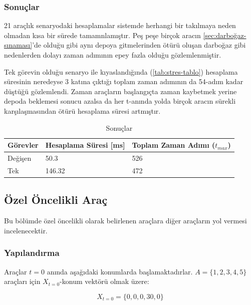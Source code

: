     \subsubsection{Sonuçlar}
    
    21 araçlık senaryodaki hesaplamalar sistemde herhangi bir takılmaya neden olmadan kısa bir sürede tamamnlamıştır. Peş peşe birçok aracın \autoref{sec:darboğaz-sınaması}'de olduğu gibi aynı depoya gitmelerinden ötürü oluşan darboğaz gibi nedenlerden dolayı zaman adımının epey fazla olduğu gözlemlenmiştir.
    
    Tek görevin olduğu senaryo ile kıyaslandığında (\autoref{tab:stres-tablo}) hesaplama süresinin neredeyse 3 katına çıktığı toplam zaman adımının da 54-adım kadar düştüğü gözlemlendi. Zaman araçların başlangıçta zaman kaybetmek yerine depoda beklemesi sonucu azalsa da her t-anında yolda birçok aracın sürekli karşılaşmasından ötürü hesaplama süresi artmıştır.
    
    
    \begin{table}[h]
        \centering
        \caption{Sonuçlar} \label{tab:stres-tablo}
        \begin{tabular}{l|l|l}
            Görevler & Hesaplama Süresi [ms] & Toplam Zaman Adımı ($t_{max}$) \\
            \hline
            Değişen & 50.3  & 526 \\
            \hline
            Tek & 146.32  & 472 \\
        \end{tabular}
    \end{table}
    
    \subsection{Özel Öncelikli Araç}
    
    Bu bölümde özel öncelikli olarak belirlenen araçlara diğer araçların yol vermesi incelenecektir.
    
    \subsubsection{Yapılandırma}
    
        Araçlar $t = 0$ anında aşağıdaki konumlarda başlamaktadırlar. $A = \{1, 2, 3, 4, 5\}$ araçları için $X_{t = 0}$-konum vektörü olmak üzere:
    
    \begin{equation}
        X_{t = 0} = \{0, 0, 0, 30, 0 \}
    \end{equation}
    
